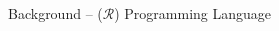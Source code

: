 \begin{frame}{Background -- \WhileCC($\mathcal{R}$) Programming Language}
\setlength{\columnsep}{-0.5cm}
\begin{multicols}{2}
    \pause
\end{multicols}
\end{frame}

